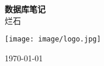 \documentclass[UTF8,a4paper,12pt,autoindent=true,fontset=none,zihao=-4,scheme=chinese,space=auto]{ctexart}
\begin{document}
\begin{titlepage}
    \centering %
    \vspace{2cm} %
    {\Huge \textbf{数据库笔记}} \\
    \vspace{1.5cm}
    {\Large 烂石} \\
    \vspace{2cm}
    \begin{flushleft}
        \centering %
        \texttt{[image: image/logo.jpg]} %
    \end{flushleft}
    \vfill
    {\large \today}
\end{titlepage}












\end{document}
